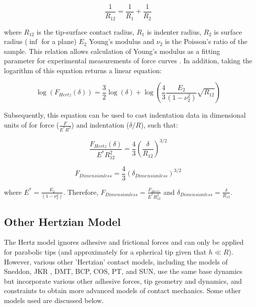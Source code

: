 $$\frac{1}{R_{12}} = \frac{1}{R_{1}} + \frac{1}{R_{2}} $$

where $R_{12}$ is the tip-surface contact radius, $R_1$ is indenter radius, $R_2$ is surface radius ($\inf$ for a plane) $E_2$ Young’s modulus and $\nu_2$ is the Poisson’s ratio of the sample. This relation allows calculation of Young’s modulus as a fitting parameter for experimental measurements of force curves \cite{dokukin2013quantitative,vinckier1998measuring,glaubitz2014novel}. In addition, taking the logarithm of this equation returns a linear equation:

\begin{equation} \log\left(F_{Hertz}(\delta) \right) = \frac{3}{2}\log(\delta) + \log\left(\frac{4}{3} \frac{E_2}{(1-\nu_2^2)} \sqrt{R_{12}}\right) \label{eq: Hertz Log}\end{equation}

Subsequently, this equation can be used to cast indentation data in dimensional units of for force ($\frac{F}{E^*R^2}$) and indentation ($\delta/R$), such that:

\begin{equation} \frac{F_{Hertz}(\delta)}{E^*R_{12}^2}  =  \frac{4}{3}(\frac{\delta}{R_{12}})^{3/2} \label{eq: Hertz Dimensionless} \end{equation}

\begin{equation} F_{Dimensionless}  =  \frac{4}{3}(\delta_{Dimensionless})^{3/2} \label{eq: Dimensionless Units} \end{equation}

where $E^* = \frac{E_2}{(1-\nu_2^2)}$. Therefore, $F_{Dimensionless} = \frac{F_{Hertz}}{E^*R_{12}^2}$ and $\delta_{Dimensionless} = \frac{\delta}{R_{12}}$. 

\subsection{Other Hertzian Model}
The Hertz model ignores adhesive and frictional forces and can only be applied for parabolic tips (and approximately for a spherical tip given that $h \ll R$). However, various other 'Hertzian' contact models\cite{korayem2014modeling}, including the models of Sneddon\cite{harding1945elastic,han2021modified}, JKR\cite{johnson1971surface} , DMT\cite{derjaguin1975effect}, BCP\cite{burnham2020surface}, COS\cite{carpick1999general}, PT\cite{pietrement2000general}, and SUN\cite{sun2004using}, use the same base dynamics but incorporate various other adhesive forces, tip geometry and dynamics, and constraints to obtain more advanced models of contact mechanics. Some other models used are discussed below.


